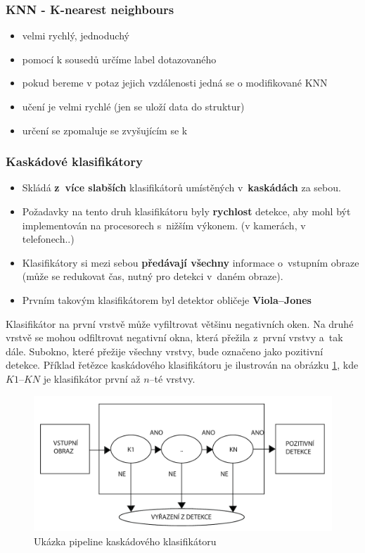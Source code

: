 \subsubsection{KNN - K-nearest neighbours}
\begin{itemize}
\item velmi rychlý, jednoduchý
\item pomocí k sousedů určíme label dotazovaného 
\item pokud bereme v potaz jejich vzdálenosti jedná se o modifikované KNN
\item učení je velmi rychlé (jen se uloží data do struktur)
\item určení se zpomaluje se zvyšujícím se k
\end{itemize}

\subsubsection{Kaskádové klasifikátory} %
\begin{itemize}
  \item Skládá \textbf{z~více slabších} klasifikátorů umístěných v~\textbf{kaskádách} za sebou.
  \item Požadavky na tento druh klasifikátoru byly \textbf{rychlost} detekce, aby mohl být implementován na procesorech s~nižším výkonem. (v kamerách, v telefonech..)
  \item Klasifikátory si mezi sebou \textbf{předávají všechny} informace o~vstupním obraze (může se redukovat čas, nutný pro detekci v~daném obraze).
  \item Prvním takovým klasifikátorem byl detektor obličeje \textbf{Viola--Jones}
\end{itemize}
Klasifikátor na první vrstvě může vyfiltrovat většinu negativních oken. Na druhé vrstvě se mohou odfiltrovat  negativní okna, která přežila z~první vrstvy a~tak dále. Subokno, které přežije všechny vrstvy, bude označeno jako pozitivní detekce. Příklad řetězce kaskádového klasifikátoru je ilustrován na obrázku \ref{fig:ccpipeline}, kde $K1$--$KN$ je klasifikátor první až $n$--té vrstvy.

\begin{figure}[H]
\centering
\includegraphics[width=.6\linewidth]{assets/9_cascadeClass.pdf}
\caption{Ukázka pipeline kaskádového klasifikátoru}
\label{fig:ccpipeline}
\end{figure}

